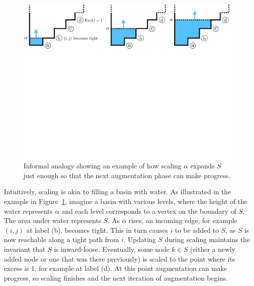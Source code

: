 \documentclass[11pt]{article}
\makeatletter
\let\comment\todo
\newcommand{\david}[1]{\comment[nolist,color=orange!40]{@david\\ #1}}
\theoremstyle{definition}
\theoremstyle{definition}
\theoremstyle{definition}
\newcommand{\din}{\delta^{\text{in}}}
\renewcommand{\todo}[1]{\hl{TODO: #1}}
\makeatother
\begin{document}
    \begin{figure}[b!]
    \centering
    \includegraphics[width=\textwidth]{figs/alpha.pdf}
    \caption{
    \label{fig:alpha}
		Informal analogy showing an example of how scaling $\alpha$ expands $S$
		just enough so that the next augmentation phase can make progress.
    }
    \end{figure}

	Intuitively, scaling is
	akin to filling a basin with water. As illustrated in the example in
	Figure~\ref{fig:alpha},	imagine a basin with various levels,
	where the height of the water represents $\alpha$ and each
	level corresponds to a vertex on the boundary of $S$. The area under water
	represents $S$.
	As $\alpha$ rises, an incoming edge, for example $(i, j)$ at label (b),
	becomes tight. This in turn
	causes $i$ to be added to $S$, as $S$ is now reachable along a tight
	path from $i$. Updating $S$ during scaling maintains the invariant that
	$S$ is inward-loose. Eventually, some node $k \in S$ (either a newly added
	node or
	one that was there previously) is scaled to the point where its excess is 1,
	for example at label (d).
	At this point augmentation can make progress, so scaling finishes and the next
	iteration of augmentation begins.
		
\end{document}
